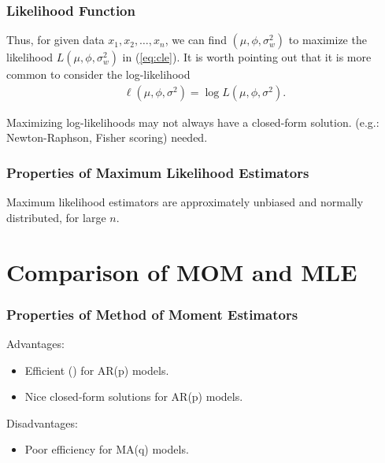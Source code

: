 \documentclass[%
xcolor=pdftex]{beamer}
\begin{document}
\begin{frame}
\frametitle{Likelihood Function}

Thus, for given data $x_1,x_2,\ldots,x_n$, we can find
$(\mu,\phi,\sigma^2_w)$ to maximize the likelihood
$L(\mu,\phi,\sigma^2_w)$ in (\ref{eq:cle}). It is worth
pointing out that it is more common to consider the log-likelihood
\begin{eqnarray*}
\ell(\mu,\phi,\sigma^2) = \log L(\mu,\phi,\sigma^2).
\end{eqnarray*}

Maximizing log-likelihoods may not always have a closed-form solution. \underline{\hspace{30 mm}} (e.g.: Newton-Raphson, Fisher scoring) needed.

\end{frame}

\begin{frame}
\frametitle{Properties of Maximum Likelihood Estimators}

Maximum likelihood estimators are approximately unbiased and normally distributed, for large $n$.
\end{frame}

\section{Comparison of MOM and MLE}
\frame{\tableofcontents[currentsection]}


\begin{frame}
\frametitle{Properties of Method of Moment Estimators}

Advantages:

\begin{itemize}
\item Efficient (\underline{\hspace{35 mm}}) for AR(p) models.
\item Nice closed-form solutions for AR(p) models.
\end{itemize}

Disadvantages:

\begin{itemize}
\item Poor efficiency for MA(q) models.
\end{itemize}

\end{frame}
\end{document}
